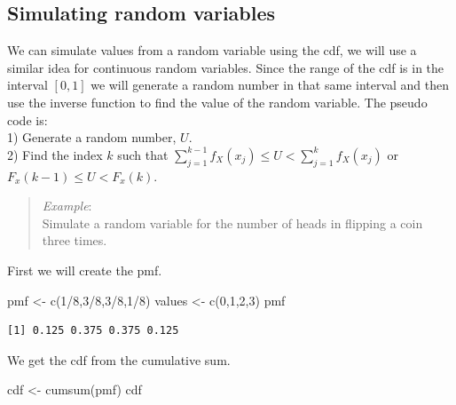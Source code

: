 \documentclass[
  letterpaper,
  DIV=11,
  numbers=noendperiod]{scrreprt}
\newenvironment{Shaded}{\begin{snugshade}}{\end{snugshade}}
\newcommand{\DecValTok}[1]{\textcolor[rgb]{0.68,0.00,0.00}{#1}}
\newcommand{\FunctionTok}[1]{\textcolor[rgb]{0.28,0.35,0.67}{#1}}
\newcommand{\NormalTok}[1]{\textcolor[rgb]{0.00,0.23,0.31}{#1}}
\newcommand{\OtherTok}[1]{\textcolor[rgb]{0.00,0.23,0.31}{#1}}
\newcommand{\SpecialCharTok}[1]{\textcolor[rgb]{0.37,0.37,0.37}{#1}}
\begin{document}
\subsection{Simulating random
variables}\label{simulating-random-variables}

We can simulate values from a random variable using the cdf, we will use
a similar idea for continuous random variables. Since the range of the
cdf is in the interval \([0,1]\) we will generate a random number in
that same interval and then use the inverse function to find the value
of the random variable. The pseudo code is:\\
1) Generate a random number, \(U\).\\
2) Find the index \(k\) such that
\(\sum_{j=1}^{k-1}f_X(x_{j}) \leq U < \sum_{j=1}^{k}f_X(x_{j})\) or
\(F_x(k-1) \leq U < F_{x}(k)\).

\begin{quote}
\emph{Example}:\\
Simulate a random variable for the number of heads in flipping a coin
three times.
\end{quote}

First we will create the pmf.

\begin{Shaded}
\begin{Highlighting}[]
\NormalTok{pmf }\OtherTok{\textless{}{-}} \FunctionTok{c}\NormalTok{(}\DecValTok{1}\SpecialCharTok{/}\DecValTok{8}\NormalTok{,}\DecValTok{3}\SpecialCharTok{/}\DecValTok{8}\NormalTok{,}\DecValTok{3}\SpecialCharTok{/}\DecValTok{8}\NormalTok{,}\DecValTok{1}\SpecialCharTok{/}\DecValTok{8}\NormalTok{)}
\NormalTok{values }\OtherTok{\textless{}{-}} \FunctionTok{c}\NormalTok{(}\DecValTok{0}\NormalTok{,}\DecValTok{1}\NormalTok{,}\DecValTok{2}\NormalTok{,}\DecValTok{3}\NormalTok{)}
\NormalTok{pmf}
\end{Highlighting}
\end{Shaded}

\begin{verbatim}
[1] 0.125 0.375 0.375 0.125
\end{verbatim}

We get the cdf from the cumulative sum.

\begin{Shaded}
\begin{Highlighting}[]
\NormalTok{cdf }\OtherTok{\textless{}{-}} \FunctionTok{cumsum}\NormalTok{(pmf)}
\NormalTok{cdf}
\end{Highlighting}
\end{Shaded}
\end{document}
